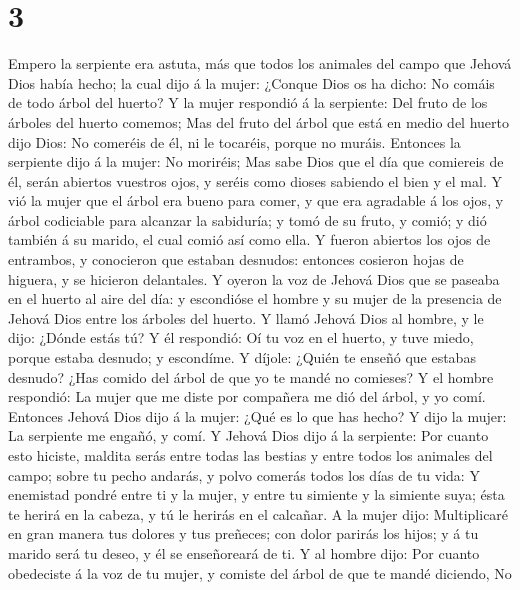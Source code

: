 \hypertarget{section-2}{%
\section{3}\label{section-2}}

 Empero la serpiente era astuta, más que todos los animales
del campo que Jehová Dios había hecho; la cual dijo á la mujer: ¿Conque
Dios os ha dicho: No comáis de todo árbol del huerto?  Y la
mujer respondió á la serpiente: Del fruto de los árboles del huerto
comemos;  Mas del fruto del árbol que está en medio del
huerto dijo Dios: No comeréis de él, ni le tocaréis, porque no muráis.
 Entonces la serpiente dijo á la mujer: No moriréis;
 Mas sabe Dios que el día que comiereis de él, serán
abiertos vuestros ojos, y seréis como dioses sabiendo el bien y el mal.
 Y vió la mujer que el árbol era bueno para comer, y que era
agradable á los ojos, y árbol codiciable para alcanzar la sabiduría; y
tomó de su fruto, y comió; y dió también á su marido, el cual comió así
como ella.  Y fueron abiertos los ojos de entrambos, y
conocieron que estaban desnudos: entonces cosieron hojas de higuera, y
se hicieron delantales.  Y oyeron la voz de Jehová Dios que
se paseaba en el huerto al aire del día: y escondióse el hombre y su
mujer de la presencia de Jehová Dios entre los árboles del huerto.
 Y llamó Jehová Dios al hombre, y le dijo: ¿Dónde estás tú?
 Y él respondió: Oí tu voz en el huerto, y tuve miedo,
porque estaba desnudo; y escondíme.  Y díjole: ¿Quién te
enseñó que estabas desnudo? ¿Has comido del árbol de que yo te mandé no
comieses?  Y el hombre respondió: La mujer que me diste por
compañera me dió del árbol, y yo comí.  Entonces Jehová
Dios dijo á la mujer: ¿Qué es lo que has hecho? Y dijo la mujer: La
serpiente me engañó, y comí.  Y Jehová Dios dijo á la
serpiente: Por cuanto esto hiciste, maldita serás entre todas las
bestias y entre todos los animales del campo; sobre tu pecho andarás, y
polvo comerás todos los días de tu vida:  Y enemistad
pondré entre ti y la mujer, y entre tu simiente y la simiente suya; ésta
te herirá en la cabeza, y tú le herirás en el calcañar.  A
la mujer dijo: Multiplicaré en gran manera tus dolores y tus preñeces;
con dolor parirás los hijos; y á tu marido será tu deseo, y él se
enseñoreará de ti.  Y al hombre dijo: Por cuanto obedeciste
á la voz de tu mujer, y comiste del árbol de que te mandé diciendo, No
